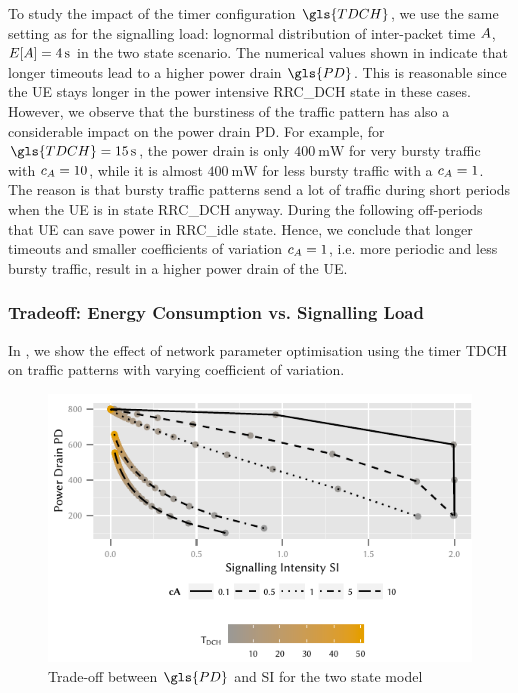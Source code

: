 To study the impact of the timer configuration \(\gls{TDCH}\), we use the same setting as for the signalling load: lognormal distribution of inter-packet time \(A\), \(E[A] = \SI{4}{\second}\) in the two state scenario.
The numerical values shown in  indicate that longer timeouts lead to a higher power drain \(\gls{PD}\).
This is reasonable since the UE stays longer in the power intensive \gls{RRC_DCH} state in these cases.
However, we observe that the burstiness of the traffic pattern has also a considerable impact on the power drain \gls{PD}. 
For example, for \(\gls{TDCH} = \SI{15}{\second}\), the power drain is only \(\SI{400}{\milli\watt}\) for very bursty traffic with \(c_{A} = 10\), while it is almost \(\SI{400}{\milli\watt}\) for less bursty traffic with a \(c_{A} = 1\). 
The reason is that bursty traffic patterns send a lot of traffic during short periods when the UE is in state \gls{RRC_DCH} anyway. During the following off-periods that \gls{UE} can save power in \gls{RRC_idle} state.
Hence, we conclude that longer timeouts and smaller coefficients of variation \(c_{A} = 1\), i.e. more periodic and less bursty traffic, result in a higher power drain of the \gls{UE}.

\subsubsection*{Tradeoff: Energy Consumption vs. Signalling Load}\label{sec:network:performance_model:trade_off}
In , we show the effect of network parameter optimisation using the timer \gls{TDCH} on traffic patterns with varying coefficient of variation.

\begin{figure}
	\centering
	\includegraphics{network/performance_model/numerical_examples/figures/2state_pd_vs_si_vs_tdch}
	\caption{Trade-off between \(\gls{PD}\) and \gls{SI} for the two state model}
	\label{fig:network:performance_model:numerical_examples:validations:analytic_vs_simulation:2state_pd_vs_si_vs_tdch}
\end{figure}

